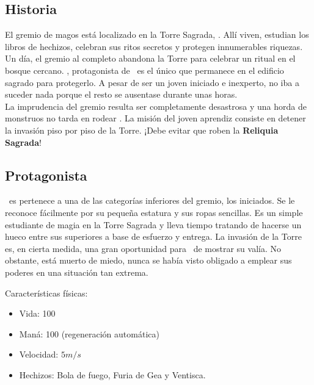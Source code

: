 \documentclass[a4paper,11pt]{article}
\begin{document}

\subsection{Historia}

El gremio de magos está localizado en la Torre Sagrada, \juego. Allí viven,
estudian los libros de hechizos, celebran sus ritos secretos y protegen
innumerables riquezas. Un día, el gremio al completo abandona la Torre para
celebrar un ritual en el bosque cercano. \prota, protagonista
de \juego\ es el único que permanece en el edificio sagrado para protegerlo.
A pesar de ser un joven iniciado e inexperto, no iba a suceder nada porque
el resto se ausentase durante unas horas.\\

La imprudencia del gremio resulta ser completamente desastrosa y una horda
de monstruos no tarda en rodear \juego. La misión del joven aprendiz consiste
en detener la invasión piso por piso de la Torre. ¡Debe evitar que roben
la \textbf{Reliquia Sagrada}!

\subsection{Protagonista}

\prota\ es pertenece a una de las categorías inferiores del gremio, los
iniciados. Se le reconoce fácilmente por su pequeña estatura y sus ropas
sencillas. Es un simple estudiante de magia en la Torre Sagrada y lleva
tiempo tratando de hacerse un hueco entre sus superiores a base de esfuerzo
y entrega. La invasión de la Torre es, en cierta medida, una gran oportunidad
para \prota\ de mostrar su valía. No obstante, está muerto de miedo, nunca
se había visto obligado a emplear sus poderes en una situación tan extrema.


Características físicas:

\begin{itemize}
    \itemsep0em
    \item Vida: 100
    \item Maná: 100 (regeneración automática)
    \item Velocidad: $5 m/s$
    \item Hechizos: Bola de fuego, Furia de Gea y Ventisca.
\end{itemize}
\end{document}
